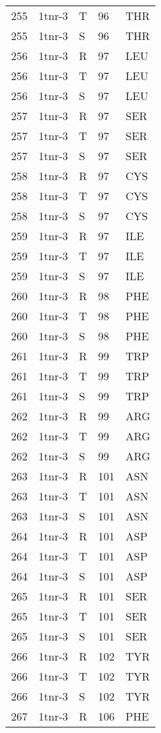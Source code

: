 \begin{longtable}[l]{l|l|l|l|l}
	255 & 1tnr-3 & T & 96 & THR \\
	255 & 1tnr-3 & S & 96 & THR \\
	256 & 1tnr-3 & R & 97 & LEU \\
	256 & 1tnr-3 & T & 97 & LEU \\
	256 & 1tnr-3 & S & 97 & LEU \\
	257 & 1tnr-3 & R & 97 & SER \\
	257 & 1tnr-3 & T & 97 & SER \\
	257 & 1tnr-3 & S & 97 & SER \\
	258 & 1tnr-3 & R & 97 & CYS \\
	258 & 1tnr-3 & T & 97 & CYS \\
	258 & 1tnr-3 & S & 97 & CYS \\
	259 & 1tnr-3 & R & 97 & ILE \\
	259 & 1tnr-3 & T & 97 & ILE \\
	259 & 1tnr-3 & S & 97 & ILE \\
	260 & 1tnr-3 & R & 98 & PHE \\
	260 & 1tnr-3 & T & 98 & PHE \\
	260 & 1tnr-3 & S & 98 & PHE \\
	261 & 1tnr-3 & R & 99 & TRP \\
	261 & 1tnr-3 & T & 99 & TRP \\
	261 & 1tnr-3 & S & 99 & TRP \\
	262 & 1tnr-3 & R & 99 & ARG \\
	262 & 1tnr-3 & T & 99 & ARG \\
	262 & 1tnr-3 & S & 99 & ARG \\
	263 & 1tnr-3 & R & 101 & ASN \\
	263 & 1tnr-3 & T & 101 & ASN \\
	263 & 1tnr-3 & S & 101 & ASN \\
	264 & 1tnr-3 & R & 101 & ASP \\
	264 & 1tnr-3 & T & 101 & ASP \\
	264 & 1tnr-3 & S & 101 & ASP \\
	265 & 1tnr-3 & R & 101 & SER \\
	265 & 1tnr-3 & T & 101 & SER \\
	265 & 1tnr-3 & S & 101 & SER \\
	266 & 1tnr-3 & R & 102 & TYR \\
	266 & 1tnr-3 & T & 102 & TYR \\
	266 & 1tnr-3 & S & 102 & TYR \\
	267 & 1tnr-3 & R & 106 & PHE \\

\end{longtable}

